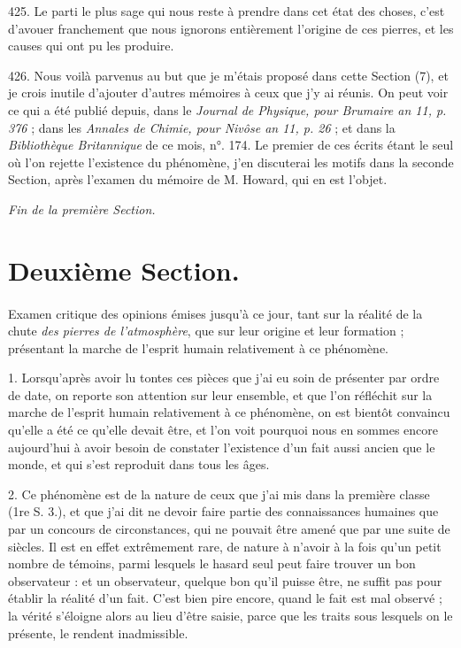 \documentclass[a4paper, 11pt, oneside, polutonikogreek, french]{article}
\begin{document}
425. Le parti le plus sage qui nous reste à prendre dans cet état des choses, c'est d'avouer franchement que nous ignorons entièrement l'origine de ces pierres, et les causes qui ont pu les produire.

426. Nous voilà parvenus au but que je m'étais proposé dans cette Section (7), et je crois inutile d'ajouter d'autres mémoires à ceux que j'y ai réunis. On peut voir ce qui a été publié depuis, dans le \emph{Journal de Physique, pour Brumaire an 11, p. 376} ; dans les \emph{Annales de Chimie, pour Nivôse an 11, p. 26} ; et dans la \emph{Bibliothèque Britannique} de ce mois, n°. 174. Le premier de ces écrits étant le seul où l'on rejette l'existence du phénomène, j'en discuterai les motifs dans la seconde Section, après l'examen du mémoire de M. Howard, qui en est l'objet.

\emph{Fin de la première Section.}
\clearpage
\section{Deuxième Section.}
\paragraph{}
Examen critique des opinions émises jusqu'à ce jour, tant sur la réalité de la chute \emph{des pierres de l'atmosphère}, que sur leur origine et leur formation ; présentant la marche de l'esprit humain relativement à ce phénomène.

1. Lorsqu’après avoir lu tontes ces pièces que j'ai eu soin de présenter par ordre de date, on reporte son attention sur leur ensemble, et que l'on réfléchit sur la marche de l'esprit humain relativement à ce phénomène, on est bientôt convaincu qu'elle a été ce qu'elle devait être, et l'on voit pourquoi nous en sommes encore aujourd'hui à avoir besoin de constater l'existence d'un fait aussi ancien que le monde, et qui s'est reproduit dans tous les âges.

2. Ce phénomène est de la nature de ceux que j'ai mis dans la première classe (1re S. 3.), et que j'ai dit ne devoir faire partie des connaissances humaines que par un concours de circonstances, qui ne pouvait être amené que par une suite de siècles. Il est en effet extrêmement rare, de nature à n'avoir à la fois qu'un petit nombre de témoins, parmi lesquels le hasard seul peut faire trouver un bon observateur : et un observateur, quelque bon qu'il puisse être, ne suffit pas pour établir la réalité d'un fait. C'est bien pire encore, quand le fait est mal observé ; la vérité s'éloigne alors au lieu d'être saisie, parce que les traits sous lesquels on le présente, le rendent inadmissible.
\end{document}
